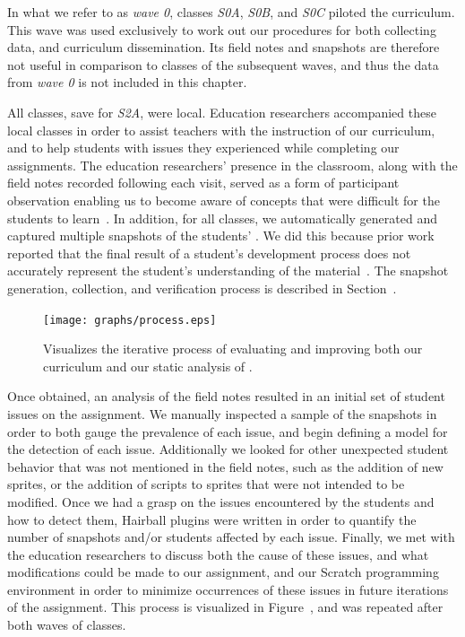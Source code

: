 In what we refer to as \emph{wave 0}, classes \emph{S0A}, \emph{S0B}, and
\emph{S0C} piloted the curriculum. This wave was used exclusively to work out
our procedures for both collecting data, and curriculum dissemination. Its
field notes and snapshots are therefore not useful in comparison to classes of
the subsequent waves, and thus the data from \emph{wave 0} is not included in
this chapter.

All classes, save for \emph{S2A}, were local. Education researchers accompanied
these local classes in order to assist teachers with the instruction of our
curriculum, and to help students with issues they experienced while completing
our assignments. The education researchers' presence in the classroom, along
with the field notes recorded following each visit, served as a form of
participant observation enabling us to become aware of concepts that were
difficult for the students to learn~\cite{spradley80}. In addition, for all
classes, we automatically generated and captured multiple snapshots of the
students' . We did this because prior work reported that the final
result of a student's development process does not accurately represent the
student's understanding of the
material~\cite{Piech:2012:MSL:2157136.2157182,brennan12}. The snapshot
generation, collection, and verification process is described in
Section~.

\begin{figure}[!t]
\centering
\texttt{[image: graphs/process.eps]}
\caption{Visualizes the iterative process of evaluating and improving both our
  curriculum and our static analysis of .}
\end{figure}

Once obtained, an analysis of the field notes resulted in an initial set of
student issues on the assignment. We manually inspected a sample of the
snapshots in order to both gauge the prevalence of each issue, and begin
defining a model for the detection of each issue. Additionally we looked for
other unexpected student behavior that was not mentioned in the field notes,
such as the addition of new sprites, or the addition of scripts to sprites that
were not intended to be modified. Once we had a grasp on the issues encountered
by the students and how to detect them, Hairball plugins were written in order
to quantify the number of snapshots and/or students affected by each
issue. Finally, we met with the education researchers to discuss both the cause
of these issues, and what modifications could be made to our assignment, and
our Scratch programming environment in order to minimize occurrences of these
issues in future iterations of the assignment. This process is visualized in
Figure~, and was repeated after both waves of classes.

